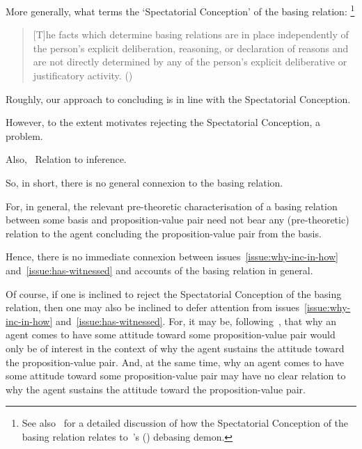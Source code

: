 \begin{note}
  More generally, what \citeauthor{Leite:2004uv} terms the `Spectatorial Conception' of the basing relation:%
  \footnote{
    See also~\textcite{Bondy:2018tk} for a detailed discussion of how the Spectatorial Conception of the basing relation relates to~\citeauthor{Schaffer:2010vq}'s (\citeyear{Schaffer:2010vq}) debasing demon.
  }
  \begin{quote}
    [T]he facts which determine basing relations are in place independently of the person’s explicit deliberation, reasoning, or declaration of reasons and are not directly determined by any of the person’s explicit deliberative or justificatory activity.%
    \mbox{}\hfill\mbox{(\citeyear[229]{Leite:2004uv})}
  \end{quote}

  Roughly, our approach to concluding is in line with the Spectatorial Conception.

  However, to the extent \citeauthor{Leite:2004uv} motivates rejecting the Spectatorial Conception, a problem.

  {
    \color{red}
    Also,~\cite{Sylvan:2016wq}
    Relation to inference.
  }
\end{note}

\begin{note}
  So, in short, there is no general connexion to the basing relation.

  For, in general, the relevant pre-theoretic characterisation of a basing relation between some basis and proposition-value pair need not bear any (pre-theoretic) relation to the agent concluding the proposition-value pair from the basis.

  Hence, there is no immediate connexion between issues~\ref{issue:why-inc-in-how} and~\ref{issue:has-witnessed} and accounts of the basing relation in general.

  Of course, if one is inclined to reject the Spectatorial Conception of the basing relation, then one may also be inclined to defer attention from issues~\ref{issue:why-inc-in-how} and~\ref{issue:has-witnessed}.
  For, it may be, following~\citeauthor{Evans:2013tw}, that why an agent comes to have some attitude toward some proposition-value pair would only be of interest in the context of why the agent sustains the attitude toward the proposition-value pair.
  And, at the same time, why an agent comes to have some attitude toward some proposition-value pair may have no clear relation to why the agent sustains the attitude toward the proposition-value pair.
\end{note}

